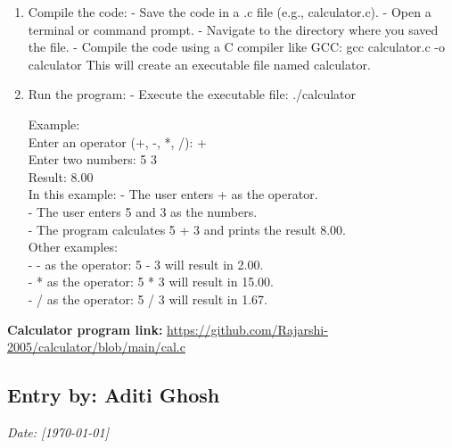 \documentclass[a4paper,12pt]{article}
\begin{document}
\begin{enumerate}

\item Compile the code:
   - Save the code in a .c file (e.g., calculator.c).
   - Open a terminal or command prompt.
   - Navigate to the directory where you saved the file.
   - Compile the code using a C compiler like GCC:
     gcc calculator.c -o calculator
     This will create an executable file named calculator.\\

\item Run the program:
   - Execute the executable file:
     ./calculator

Example:\\
Enter an operator (+, -, *, /): +\\
Enter two numbers: 5 3\\
Result: 8.00\\

In this example:
- The user enters + as the operator.\\
- The user enters 5 and 3 as the numbers.\\
- The program calculates 5 + 3 and prints the result 8.00.\\

Other examples:\\
- - as the operator: 5 - 3 will result in 2.00.\\
- * as the operator: 5 * 3 will result in 15.00.\\
- / as the operator: 5 / 3 will result in 1.67.\\
\end{enumerate}
\vspace{0.5 cm}

\textbf{Calculator program link:} \href{https://github.com/Rajarshi-2005/calculator/blob/main/cal.c}{https://github.com/Rajarshi-2005/calculator/blob/main/cal.c}



\newpage
{}
\vspace{-2cm}
\subsection*{Entry by: Aditi Ghosh}
\textit{Date: [\today]}\\
\end{document}
